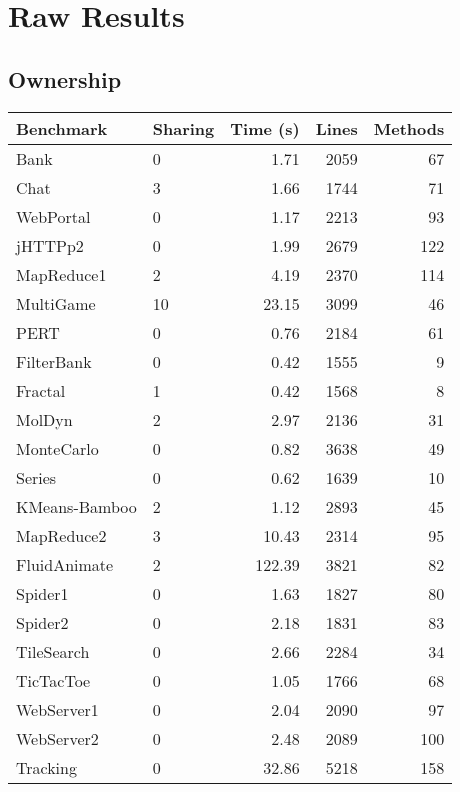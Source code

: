 \documentclass{amsart}[9pt]
\begin{document}
\newpage

\section{Raw Results}


\subsection{Ownership}

\begin{tabular}{|l|l|r|r|r|}
\hline
Benchmark & Sharing & Time (s) & Lines & Methods \\
\hline
Bank          & 0  & 1.71   & 2059 & 67 \\
Chat          & 3  & 1.66   & 1744 & 71 \\
WebPortal     & 0  & 1.17   & 2213 & 93 \\
jHTTPp2       & 0  & 1.99   & 2679 & 122 \\
MapReduce1    & 2  & 4.19   & 2370 & 114 \\
MultiGame     & 10 & 23.15  & 3099 & 46 \\
PERT          & 0  & 0.76   & 2184 & 61 \\
FilterBank    & 0  & 0.42   & 1555 & 9 \\
Fractal       & 1  & 0.42   & 1568 & 8 \\
MolDyn        & 2  & 2.97   & 2136 & 31 \\
MonteCarlo    & 0  & 0.82   & 3638 & 49 \\
Series        & 0  & 0.62   & 1639 & 10 \\
KMeans-Bamboo & 2  & 1.12   & 2893 & 45 \\
MapReduce2    & 3  & 10.43  & 2314 & 95 \\
FluidAnimate  & 2  & 122.39 & 3821 & 82 \\
Spider1       & 0  & 1.63   & 1827 & 80 \\
Spider2       & 0  & 2.18   & 1831 & 83 \\
TileSearch    & 0  & 2.66   & 2284 & 34 \\
TicTacToe     & 0  & 1.05   & 1766 & 68 \\
WebServer1    & 0  & 2.04   & 2090 & 97 \\
WebServer2    & 0  & 2.48   & 2089 & 100 \\
Tracking      & 0  & 32.86  & 5218 & 158 \\
\hline
\end{tabular}
\end{document}
